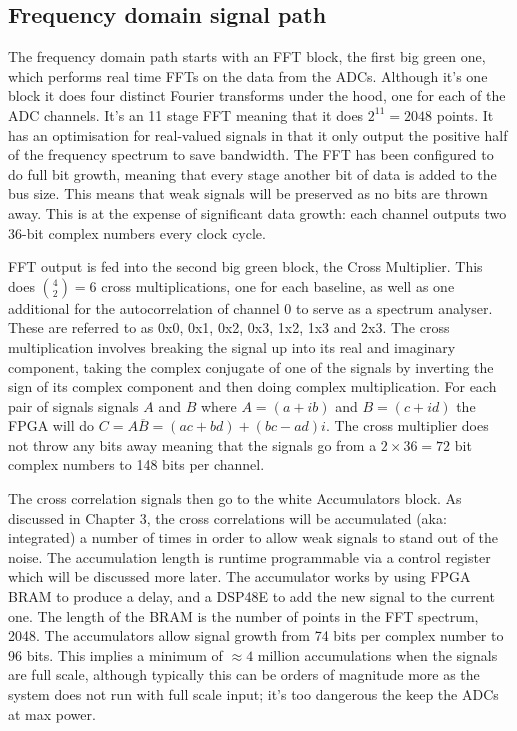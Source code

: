 \subsection{Frequency domain signal path}
The frequency domain path starts with an FFT block, the first big green one,  which performs real time FFTs on the data from the ADCs. Although it's one block it does four distinct Fourier transforms under the hood, one for each of the ADC channels. It's an 11 stage FFT meaning that it does \(2^{11} = 2048\) points. It has an optimisation for real-valued signals in that it only output the positive half of the frequency spectrum to save bandwidth. The FFT has been configured to do full bit growth, meaning that every stage another bit of data is added to the bus size. This means that weak signals will be preserved as no bits are thrown away. This is at the expense of significant data growth: each channel outputs two 36-bit complex numbers every clock cycle.

FFT output is fed into the second big green block, the Cross Multiplier. This does \({4 \choose 2} = 6\) cross multiplications, one for each baseline, as well as one additional for the autocorrelation of channel 0 to serve as a spectrum analyser. These are referred to as 0x0, 0x1, 0x2, 0x3, 1x2, 1x3 and 2x3. The cross multiplication involves breaking the signal up into its real and imaginary component, taking the complex conjugate of one of the signals by inverting the sign of its complex component and then doing complex multiplication. For each pair of signals signals \(A\) and \(B\) where \(A = (a + ib)\) and \(B = (c + id)\) the FPGA will do \(C = A\overline{B} = (ac + bd) + (bc - ad)i\). The cross multiplier does not throw any bits away meaning that the signals go from a \(2 \times 36 = 72\) bit complex numbers to 148 bits per channel.

The cross correlation signals then go to the white Accumulators block. As discussed in Chapter 3, the cross correlations will be accumulated (aka: integrated) a number of times in order to allow weak signals to stand out of the noise. The accumulation length is runtime programmable via a control register which will be discussed more later. The accumulator works by using FPGA BRAM to produce a delay, and a DSP48E to add the new signal to the current one. The length of the BRAM is the number of points in the FFT spectrum, 2048. The accumulators allow signal growth from 74 bits per complex number to 96 bits. This implies a minimum of \(\approx 4\) million accumulations when the signals are full scale, although typically this can be orders of magnitude more as the system does not run with full scale input; it's too dangerous the keep the ADCs at max power.

